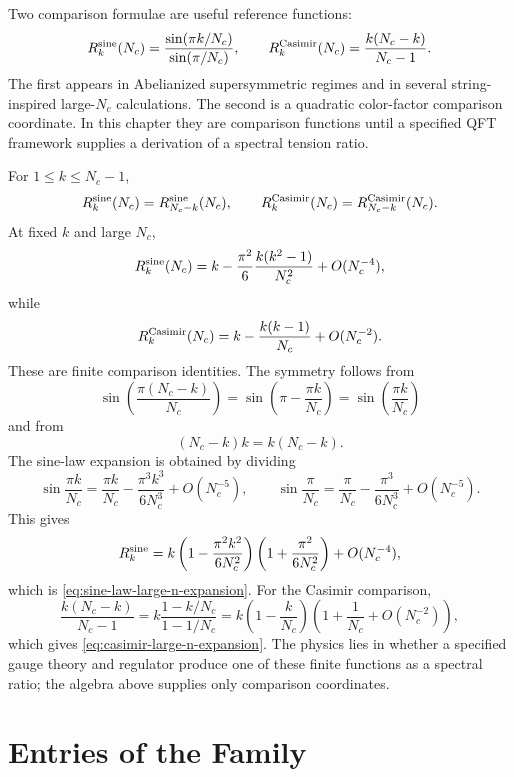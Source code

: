 Two comparison formulae are useful reference functions:
\begin{equation}
  R_k^{\rm sine}(N_c)
  =
  \frac{\sin(\pi k/N_c)}{\sin(\pi/N_c)},
  \qquad
  R_k^{\rm Casimir}(N_c)
  =
  \frac{k(N_c-k)}{N_c-1}.
  \label{eq:k-string-tension-ratios}
\end{equation}
The first appears in Abelianized supersymmetric regimes and in several
string-inspired large-\(N_c\) calculations.  The second is a quadratic
color-factor comparison coordinate.  In this chapter they are comparison
functions until a specified QFT framework supplies a derivation of a spectral
tension ratio.

For \(1\le k\le N_c-1\),
\begin{equation}
  R_k^{\rm sine}(N_c)=R_{N_c-k}^{\rm sine}(N_c),
  \qquad
  R_k^{\rm Casimir}(N_c)=R_{N_c-k}^{\rm Casimir}(N_c).
  \label{eq:k-string-charge-conjugation-symmetry}
\end{equation}
At fixed \(k\) and large \(N_c\),
\begin{equation}
  R_k^{\rm sine}(N_c)
  =
  k-\frac{\pi^2}{6}\frac{k(k^2-1)}{N_c^2}
  +O(N_c^{-4}),
  \label{eq:sine-law-large-n-expansion}
\end{equation}
while
\begin{equation}
  R_k^{\rm Casimir}(N_c)
  =
  k-\frac{k(k-1)}{N_c}+O(N_c^{-2}).
  \label{eq:casimir-large-n-expansion}
\end{equation}
These are finite comparison identities.  The symmetry follows from
\[
  \sin\!\left(\frac{\pi(N_c-k)}{N_c}\right)
  =
  \sin\!\left(\pi-\frac{\pi k}{N_c}\right)
  =
  \sin\!\left(\frac{\pi k}{N_c}\right)
\]
and from
\[
  (N_c-k)k=k(N_c-k).
\]
The sine-law expansion is obtained by dividing
\[
  \sin\frac{\pi k}{N_c}
  =
  \frac{\pi k}{N_c}
  -
  \frac{\pi^3k^3}{6N_c^3}
  +O(N_c^{-5}),
  \qquad
  \sin\frac{\pi}{N_c}
  =
  \frac{\pi}{N_c}
  -
  \frac{\pi^3}{6N_c^3}
  +O(N_c^{-5}).
\]
This gives
\[
  R_k^{\rm sine}
  =
  k\left(1-\frac{\pi^2k^2}{6N_c^2}\right)
  \left(1+\frac{\pi^2}{6N_c^2}\right)
  +O(N_c^{-4}),
\]
which is \eqref{eq:sine-law-large-n-expansion}.  For the Casimir comparison,
\[
  \frac{k(N_c-k)}{N_c-1}
  =
  k\frac{1-k/N_c}{1-1/N_c}
  =
  k\left(1-\frac{k}{N_c}\right)
  \left(1+\frac{1}{N_c}+O(N_c^{-2})\right),
\]
which gives \eqref{eq:casimir-large-n-expansion}.  The physics lies in
whether a specified gauge theory and regulator produce one of these finite
functions as a spectral ratio; the algebra above supplies only comparison
coordinates.

\section{Entries of the Family}
\label{sec:susy-ym-family-entries}

